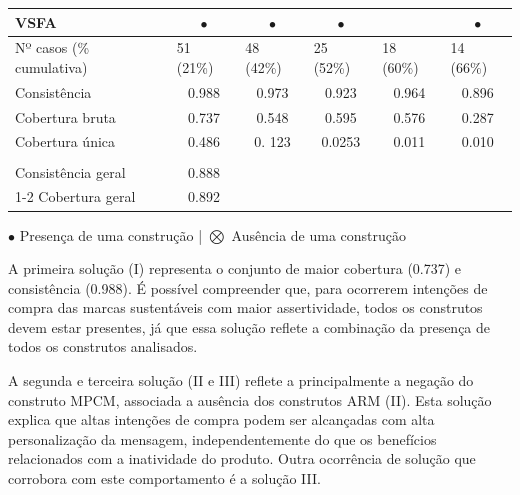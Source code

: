 \begin{table}[H]
\begin{tabular}{lcccccl}
VSFA                                              & $\bullet$                    & $\bullet$                    & $\bullet$                    &                      & \multicolumn{2}{c}{$\bullet$}     \\ \hline
Nº   casos (\% cumulativa) &
  \multicolumn{1}{l}{51   (21\%)} &
  \multicolumn{1}{l}{48   (42\%)} &
  \multicolumn{1}{l}{25   (52\%)} &
  \multicolumn{1}{l}{18   (60\%)} &
  \multicolumn{2}{l}{14   (66\%)} \\
Consistência                                      & 0.988                & 0.973                & 0.923                & 0.964                & \multicolumn{2}{c}{0.896} \\
Cobertura bruta                                   & 0.737                & 0.548                & 0.595                & 0.576                & \multicolumn{2}{c}{0.287} \\
Cobertura única                                   & 0.486                & 0.   123             & 0.0253               & 0.011                & \multicolumn{2}{c}{0.010} \\
                                                  & \multicolumn{1}{l}{} & \multicolumn{1}{l}{} & \multicolumn{1}{l}{} & \multicolumn{1}{l}{} & \multicolumn{2}{l}{}      \\ \hline
Consistência   geral                              & 0.888                & \multicolumn{1}{l}{} & \multicolumn{1}{l}{} & \multicolumn{1}{l}{} & \multicolumn{2}{l}{}      \\ \cline{1-2}
Cobertura   geral                                 & 0.892                & \multicolumn{1}{l}{} & \multicolumn{1}{l}{} & \multicolumn{1}{l}{} & \multicolumn{2}{l}{}      \\ \hline
\end{tabular}
\begin{minipage}{\linewidth}
    \raggedright
    $\bullet$ Presença de uma construção | $\bigotimes$ Ausência de uma construção
\end{minipage}
\end{table}


A primeira solução (I) representa o conjunto de maior cobertura (0.737) e consistência (0.988). É possível compreender que, para ocorrerem intenções de compra das marcas sustentáveis com maior assertividade, todos os construtos devem estar presentes, já que essa solução reflete a combinação da presença de todos os construtos analisados. 

A segunda e terceira solução (II e III) reflete a principalmente a negação do construto MPCM, associada a ausência dos construtos ARM (II). Esta solução explica que altas intenções de compra podem ser alcançadas com alta personalização da mensagem, independentemente do que os benefícios relacionados com a inatividade do produto. Outra ocorrência de solução que corrobora com este comportamento é a solução III. 

